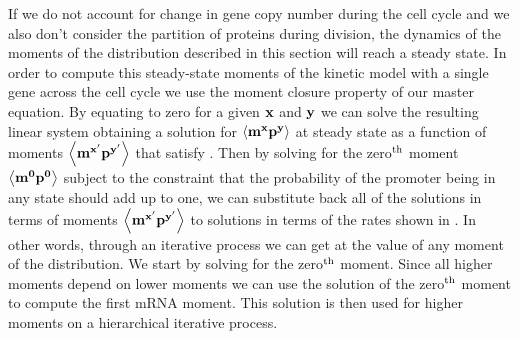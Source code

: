 If we do not account for change in gene copy number during the cell cycle and we
also don't consider the partition of proteins during division, the dynamics of
the moments of the distribution described in this section will reach a steady
state. In order to compute this steady-state moments of the kinetic model with a
single gene across the cell cycle we use the moment closure property of our
master equation. By equating  to zero for a given
$\mathbf{x}$ and $\mathbf{y}$ we can solve the resulting linear system obtaining a
solution for $\mathbf{\left\langle m^x p^y \right\rangle}$ at steady state as a function of moments
$\mathbf{\left\langle m^{x'} p^{y'} \right\rangle}$ that satisfy . Then by
solving for the zero$^\text{th}$ moment $\mathbf{\left\langle m^0 p^0 \right\rangle}$ subject to the constraint
that the probability of the promoter being in any state should add up to one, we
can substitute back all of the solutions in terms of moments $\mathbf{\left\langle m^{x'}
p^{y'} \right\rangle}$ to solutions in terms of the rates shown in .
In other words, through an iterative process we can get at the value of any
moment of the distribution. We start by solving for the zero$^\text{th}$ moment. Since
all higher moments depend on lower moments we can use the solution of the
zero$^\text{th}$ moment to compute the first mRNA moment. This solution is then used
for higher moments on a hierarchical iterative process.

